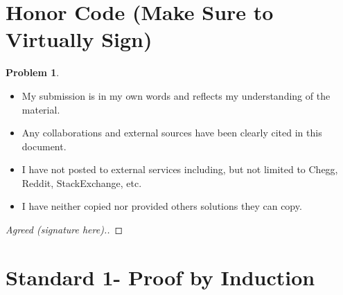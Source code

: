 \documentclass[11pt]{article}
\theoremstyle{definition}
\theoremstyle{definition}
\newtheorem{required}{Problem}
\theoremstyle{definition}
\begin{document}
\section{Honor Code (Make Sure to Virtually Sign)} \label{HonorCode}

\begin{required}
\begin{itemize}
\item My submission is in my own words and reflects my understanding of the material.
\item Any collaborations and external sources have been clearly cited in this document.
\item I have not posted to external services including, but not limited to Chegg, Reddit, StackExchange, etc.
\item I have neither copied nor provided others solutions they can copy.
\end{itemize}

\end{required}

\begin{proof}[Agreed (signature here).]
\end{proof}


\newpage
\section{Standard 1- Proof by Induction}
\end{document}
